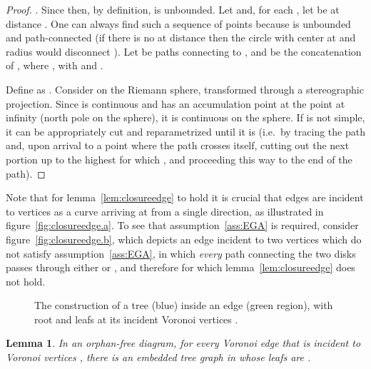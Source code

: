 \documentclass[11pt]{article}
\newtheorem{lemma}{Lemma}
\begin{document}
\begin{proof}
.
Since  then, by definition,  is unbounded. 
Let  and, for each , let  be at distance . 
One can always find such a sequence of points because  is unbounded and path-connected
	(if there is no  at distance  then the circle with center at  and radius  would disconnect ). 
Let  be paths connecting  to , 
	and  be the concatenation of , 
	where , with  and . 

Define  as . 
Consider  on the Riemann sphere, transformed through a stereographic projection. 
Since  is continuous and  has an accumulation point at the point at infinity (north pole on the sphere), 
	it is continuous on the sphere. 
If  is not simple, it can be appropriately cut and reparametrized until it is
(i.e.\ by tracing the path and, upon arrival to a point  where the path crosses itself, 
		cutting out the next portion up to the highest  for which , 
		and proceeding this way to the end of the path). 




\end{proof}


Note that for lemma~\ref{lem:closureedge} to hold it is crucial that edges  are incident to vertices  
	as a curve arriving at  from a single direction, 
	as illustrated in figure~\ref{fig:closureedge.a}.  
To see that assumption~\ref{ass:EGA} is required, 
	consider figure~\ref{fig:closureedge.b}, 
	which depicts an edge  incident to two vertices 
	which do not satisfy assumption~\ref{ass:EGA}, 
	in which \emph{every} path connecting the two disks passes through either  or , 
	and therefore for which lemma~\ref{lem:closureedge} does not hold. 

	

\begin{figure}[htbp]
   \centering
	\quad
   \caption{The construction of a tree (blue) inside an edge  (green region), with root  and leafs 
   			at its incident Voronoi vertices .}
   \label{fig:tree}
\end{figure}


\begin{lemma}\label{lem:tree}
In an orphan-free diagram, 
	for every Voronoi edge  that is incident to Voronoi vertices , 
	there is an embedded tree graph in  whose leafs are .
\end{lemma}
\end{document}
